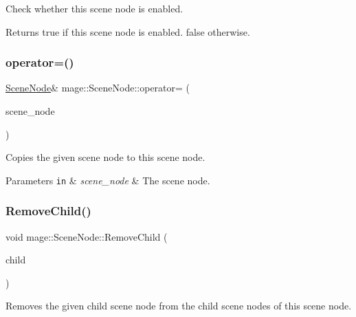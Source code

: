 Check whether this scene node is enabled.

\begin{DoxyReturn}{Returns}
{\ttfamily true} if this scene node is enabled. {\ttfamily false} otherwise. 
\end{DoxyReturn}
\hypertarget{classmage_1_1_scene_node_a37becece66e7d801e34bd6cacd0e83f2}{}\label{classmage_1_1_scene_node_a37becece66e7d801e34bd6cacd0e83f2} 
\subsubsection{\texorpdfstring{operator=()}{operator=()}}
{\footnotesize\ttfamily \hyperlink{classmage_1_1_scene_node}{Scene\+Node}\& mage\+::\+Scene\+Node\+::operator= (\begin{DoxyParamCaption}\item[{const \hyperlink{classmage_1_1_scene_node}{Scene\+Node} \&}]{scene\+\_\+node }\end{DoxyParamCaption})\hspace{0.3cm}{\ttfamily [private]}}

Copies the given scene node to this scene node.


\begin{DoxyParams}[1]{Parameters}
\mbox{\tt in}  & {\em scene\+\_\+node} & The scene node. \\
\hline
\end{DoxyParams}
\hypertarget{classmage_1_1_scene_node_a42aa6487f21c948ab7ce6f64a57e5f11}{}\label{classmage_1_1_scene_node_a42aa6487f21c948ab7ce6f64a57e5f11} 
\subsubsection{\texorpdfstring{Remove\+Child()}{RemoveChild()}}
{\footnotesize\ttfamily void mage\+::\+Scene\+Node\+::\+Remove\+Child (\begin{DoxyParamCaption}\item[{\hyperlink{classmage_1_1_scene_node}{Scene\+Node} $\ast$}]{child }\end{DoxyParamCaption})}

Removes the given child scene node from the child scene nodes of this scene node.


